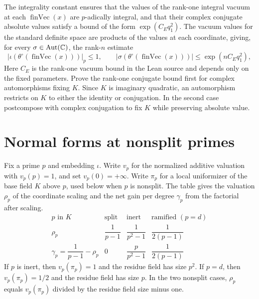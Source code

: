 The integrality constant ensures that the values of the rank-one integral vacuum at each $\operatorname{finVec}(x)$ are $p$-adically integral, and that their complex conjugate absolute values satisfy a bound of the form $\exp(C_Eq_1^2)$. The vacuum values for the standard definite space are products of the values at each coordinate, giving, for every $\sigma\in\operatorname{Aut}(\mathbb{C})$, the rank-$n$ estimate
\begin{equation}
\label{eq:ch2-vacuum-bounds}
 \bigl|\iota(\theta^\circ(\operatorname{finVec}(x)))\bigr|_p\le1,\qquad
 \bigl|\sigma(\theta^\circ(\operatorname{finVec}(x)))\bigr|
 \le\exp(nC_Eq_1^2),
\end{equation}
Here $C_E$ is the rank-one vacuum bound in the Lean source and depends only on the fixed parameters. Prove the rank-one conjugate bound first for complex automorphisms fixing $K$. Since $K$ is imaginary quadratic, an automorphism restricts on $K$ to either the identity or conjugation. In the second case postcompose with complex conjugation to fix $K$ while preserving absolute value.

\section{Normal forms at nonsplit primes}
\label{sec:ch2-normal-form}

Fix a prime $p$ and embedding $\iota$. Write $v_p$ for the normalized additive valuation with $v_p(p)=1$, and set $v_p(0)=+\infty$. Write $\pi_p$ for a local uniformizer of the base field $K$ above $p$, used below when $p$ is nonsplit. The table gives the valuation $\rho_p$ of the coordinate scaling and the net gain per degree $\gamma_p$ from the factorial after scaling.
\begin{equation}
\label{eq:ch2-slopes}
\begin{array}{c|ccc}
p\text{ in }K&\text{split}&\text{inert}&\text{ramified }(p=d)\\ \hline
\rho_p &\dfrac1{p-1}&\dfrac1{p^2-1}&\dfrac1{2(p-1)}\\[3pt]
\gamma_p=\dfrac1{p-1}-\rho_p
  &0&\dfrac{p}{p^2-1}&\dfrac1{2(p-1)}
\end{array}
\end{equation}
If $p$ is inert, then $v_p(\pi_p)=1$ and the residue field has size $p^2$. If $p=d$, then $v_p(\pi_p)=1/2$ and the residue field has size $p$. In the two nonsplit cases, $\rho_p$ equals $v_p(\pi_p)$ divided by the residue field size minus one.

